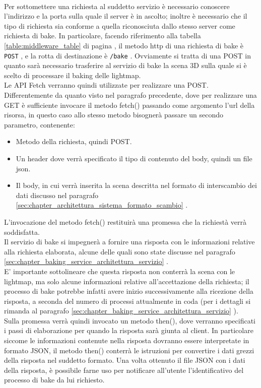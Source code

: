 \\
Per sottomettere una richiesta al suddetto servizio è necessario conoscere l’indirizzo e la porta sulla quale il server è in ascolto; inoltre è necessario che il tipo di richiesta sia conforme a quella riconosciuta dallo stesso server come richiesta di bake. In particolare, facendo riferimento alla tabella \ref{table:middleware_table} di pagina \pageref{table:middleware_table} , il metodo http di una richiesta di bake è \texttt{POST} , e la rotta di destinazione è \texttt{/bake} . Ovviamente si tratta di una POST in quanto sarà necessario trasferire al servizio di bake la scena 3D sulla quale si è scelto di processare il baking delle lightmap.
\\
Le API Fetch verranno quindi utilizzate per realizzare una POST. Differentemente da quanto visto nel paragrafo precedente, dove per realizzare una GET è sufficiente invocare il metodo fetch() passando come argomento l’url della risorsa, in questo caso allo stesso metodo bisognerà passare un secondo parametro, contenente:
\begin{itemize}
\item Metodo della richiesta, quindi POST.
\item Un header dove verrà specificato il tipo di contenuto del body, quindi un file json.
\item Il body, in cui verrà inserita la scena descritta nel formato di interscambio dei dati discusso nel paragrafo \ref{sec:chapter_architettura_sistema_formato_scambio} .
\end{itemize}
L’invocazione del metodo fetch() restituirà una promessa che la richiestà verrà soddisfatta.
\\ 
Il servizio di bake si impegnerà a fornire una risposta con le informazioni relative alla richiesta elaborata, alcune delle quali sono state discusse nel paragrafo \ref{sec:chapter_baking_service_architettura_servizio} .
\\
E’ importante sottolineare che questa risposta non conterrà la scena con le lightmap, ma solo alcune informazioni relative all’accettazione della richiesta; il processo di bake potrebbe infatti avere inizio successivamente alla ricezione della risposta, a seconda del numero di processi attualmente in coda (per i dettagli si rimanda al paragrafo \ref{sec:chapter_baking_service_architettura_servizio} ).
\\ 
Sulla promessa verrà quindi invocato un metodo then(), dove verranno specificati i passi di elaborazione per quando la risposta sarà giunta al client. In particolare siccome le informazioni contenute nella risposta dovranno essere interpretate in formato JSON, il metodo then() conterrà le istruzioni per convertire i dati grezzi della risposta nel suddetto formato. Una volta ottenuto il file JSON con i dati della risposta, è possibile farne uso per notificare all’utente l’identificativo del processo di bake da lui richiesto.
